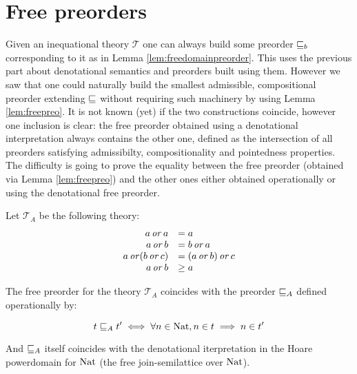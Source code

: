 
\section{Free preorders}

Given an inequational theory $\mathcal{T}$ one can always 
build some preorder $\sqsubseteq_b$ corresponding to it as in Lemma 
\ref{lem:freedomainpreorder}.
This uses the previous part about denotational semantics 
and preorders built using them. However we saw 
that one could naturally build the smallest admissible,
compositional preorder extending $\sqsubseteq$ without 
requiring such machinery by using Lemma \ref{lem:freepreo}. 
It is not known (yet) if the two constructions coincide,
however one inclusion is clear: the free preorder obtained 
using a denotational interpretation always contains 
the other one, defined as the intersection of all preorders 
satisfying admissibilty, compositionality and pointedness properties.
The difficulty is going to prove the equality between the free preorder 
(obtained via Lemma \ref{lem:freepreo}) and the other ones 
either obtained operationally or using the denotational free preorder.


\begin{lemma}
    Let $\mathcal{T}_A$ be the following theory:
    \begin{equation*}
        \begin{array}{rl}
            a \operatorname{\mathit{or}} a &= a \\
            a \operatorname{\mathit{or}} b &= b \operatorname{\mathit{or}} a \\
            a \operatorname{\mathit{or}} (b \operatorname{\mathit{or}} c) &= (a \operatorname{\mathit{or}} b) \operatorname{\mathit{or}} c \\
            a \operatorname{\mathit{or}} b &\geq a
        \end{array}
    \end{equation*}


    The free preorder for the theory 
    $\mathcal{T}_A$ coincides 
    with the preorder $\sqsubseteq_A$ defined 
    operationally by:

    \begin{equation*}
        t \sqsubseteq_A t' 
        \iff
        \forall n \in \textnormal{Nat}, n \in t \implies n \in t'
    \end{equation*}

    And $\sqsubseteq_A$ itself coincides with the denotational
    iterpretation in the Hoare powerdomain for $\textnormal{Nat}$
    (the free join-semilattice over $\textnormal{Nat}$).
\end{lemma}

